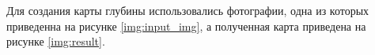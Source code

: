 Для создания карты глубины использовались фотографии, одна из которых приведенна на рисунке \ref{img:input_img}, а полученная карта приведена на рисунке \ref{img:result}.

\begin{figure}[h!]
\end{figure}